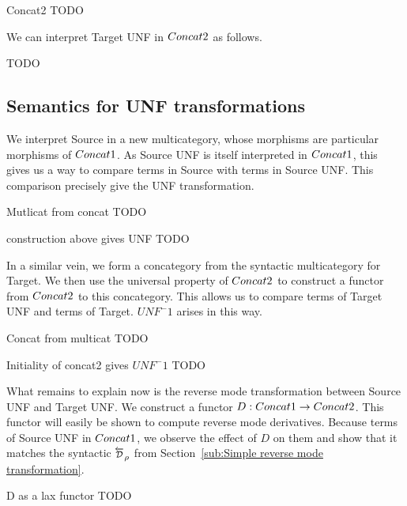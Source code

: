 \begin{example}{Concat2}
    TODO
\end{example}

We can interpret Target UNF in $Concat2$ as follows.

TODO

\subsection{Semantics for UNF transformations} %
\label{sub:Semantics for UNF transformations}

We interpret Source in a new multicategory, 
whose morphisms are particular morphisms of $Concat1$.
As Source UNF is itself interpreted in $Concat1$, 
this gives us a way to compare terms in Source with terms in Source UNF.
This comparison precisely give the UNF transformation.

\begin{definition}{Mutlicat from concat}
    TODO
\end{definition}


\begin{proposition}{construction above gives UNF}
    TODO
\end{proposition}

In a similar vein, we form a concategory from the syntactic multicategory for Target.
We then use the universal property of $Concat2$ to construct a functor from $Concat2$ to this concategory.
This allows us to compare terms of Target UNF and terms of Target. 
$UNF^-1$ arises in this way.

\begin{definition}{Concat from multicat}
    TODO
\end{definition}

\begin{proposition}{Initiality of concat2 gives $UNF^-1$}
    TODO
\end{proposition}

What remains to explain now is the reverse mode transformation between Source UNF and Target UNF.
We construct a functor $D:Concat1\to Concat2$. 
This functor will easily be shown to compute reverse mode derivatives.
Because terms of Source UNF in $Concat1$, we observe the effect of $D$ on them
and show that it matches the syntactic $\Dsynrevsymbol_{\rho}$ 
from Section~\ref{sub:Simple reverse mode transformation}.

\begin{definition}{D as a lax functor}
    TODO
\end{definition}

